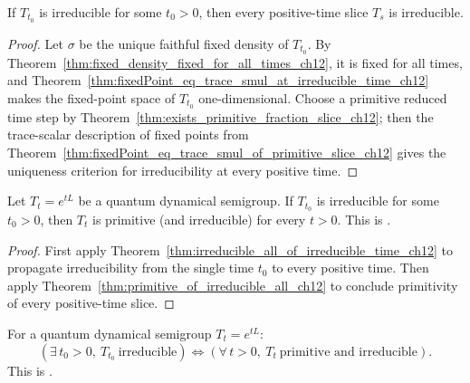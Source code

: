 \begin{theorem}
    \label{thm:irreducible_all_of_irreducible_time_ch12}
    \leanok
    If $T_{t_0}$ is irreducible for some $t_0 > 0$, then every positive-time slice $T_s$ is
    irreducible.
\end{theorem}

\begin{proof}
    \leanok
    Let $\sigma$ be the unique faithful fixed density of $T_{t_0}$. By
    Theorem~\ref{thm:fixed_density_fixed_for_all_times_ch12}, it is fixed for all times, and
    Theorem~\ref{thm:fixedPoint_eq_trace_smul_at_irreducible_time_ch12} makes the fixed-point
    space of $T_{t_0}$ one-dimensional. Choose a primitive reduced time step by
    Theorem~\ref{thm:exists_primitive_fraction_slice_ch12}; then the trace-scalar description
    of fixed points from Theorem~\ref{thm:fixedPoint_eq_trace_smul_of_primitive_slice_ch12}
    gives the uniqueness criterion for irreducibility at every positive time.
\end{proof}

\begin{theorem}
    \label{thm:irreducible_semigroup_implies_primitive}
    \leanok
    Let $T_t = e^{tL}$ be a quantum dynamical semigroup.
    If $T_{t_0}$ is irreducible for some $t_0 > 0$, then
    $T_t$ is primitive (and irreducible) for every $t > 0$.
    This is \cite[Proposition~7.5]{Wolf2012Quantum}.
\end{theorem}

\begin{proof}\leanok
    First apply Theorem~\ref{thm:irreducible_all_of_irreducible_time_ch12} to propagate
    irreducibility from the single time $t_0$ to every positive time. Then apply
    Theorem~\ref{thm:primitive_of_irreducible_all_ch12} to conclude primitivity of every
    positive-time slice.
\end{proof}

\begin{theorem}
    \label{thm:qds_irreducible_iff_primitive}
    \leanok
    For a quantum dynamical semigroup $T_t = e^{tL}$:
    \[
        (\exists\, t_0 > 0,\ T_{t_0}\ \text{irreducible})
        \iff
        (\forall\, t > 0,\ T_t\ \text{primitive and irreducible}).
    \]
    This is \cite[Proposition~7.5]{Wolf2012Quantum}.
\end{theorem}

